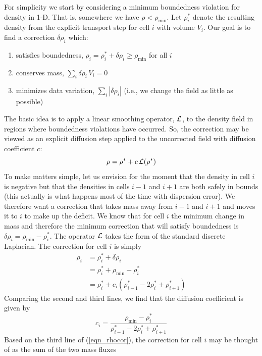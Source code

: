 For simplicity we start by considering a minimum boundedness violation for density in 1-D.  That is, somewhere we have $\rho <
\rho_{\min}$.  Let $\rho_i^*$ denote the resulting density from the explicit transport step for cell $i$ with volume $V_i$.  Our
goal is to find a correction $\delta \rho_i$ which:
\begin{enumerate}[{(}a{)}]
\item satisfies boundedness, $\rho_i = \rho_i^* + \delta \rho_i \ge \rho_{\min}$ for all $i$
\item conserves mass, $\sum_i \delta \rho_i \, V_i = 0$
\item minimizes data variation, $\sum_i |\delta \rho_i|$ (i.e., we change the field as little as possible)
\end{enumerate}
The basic idea is to apply a linear smoothing operator, $\cal L$, to the density field in regions where boundedness violations
have occurred. So, the correction may be viewed as an explicit diffusion step applied to the uncorrected field with diffusion
coefficient $c$:
\begin{equation}
\rho = \rho^* + c \, {\cal L} (\rho^*)
\end{equation}
To make matters simple, let us envision for the moment that the density in cell $i$ is negative but that the densities in cells
$i-1$ and $i+1$ are both safely in bounds (this actually is what happens most of the time with dispersion error).  We therefore
want a correction that takes mass away from $i-1$ and $i+1$ and moves it to $i$ to make up the deficit.  We know that for cell $i$
the minimum change in mass and therefore the minimum correction that will satisfy boundedness is $\delta \rho_i = \rho_{\min} -
\rho_i^*$.  The operator $\cal L$ takes the form of the standard discrete Laplacian.  The correction for cell $i$ is simply
\begin{align}
\label{eqn_rhocor}
\rho_i &= \rho_i^* + \delta \rho_i \nonumber\\
&= \rho_i^* + \rho_{\min} - \rho_i^* \nonumber\\
&=  \rho_i^* + c_i (\rho_{i-1}^* - 2 \rho_i^* + \rho_{i+1}^*)
\end{align}
Comparing the second and third lines, we find that the diffusion coefficient is given by
\begin{equation}
\label{eqn_diffcoef}
c_i = \frac{\rho_{\min} - \rho_i^*}{\rho_{i-1}^* - 2 \rho_i^* + \rho_{i+1}^*}
\end{equation}
Based on the third line of (\ref{eqn_rhocor}), the correction for cell $i$ may be thought of as the sum of the two mass fluxes
